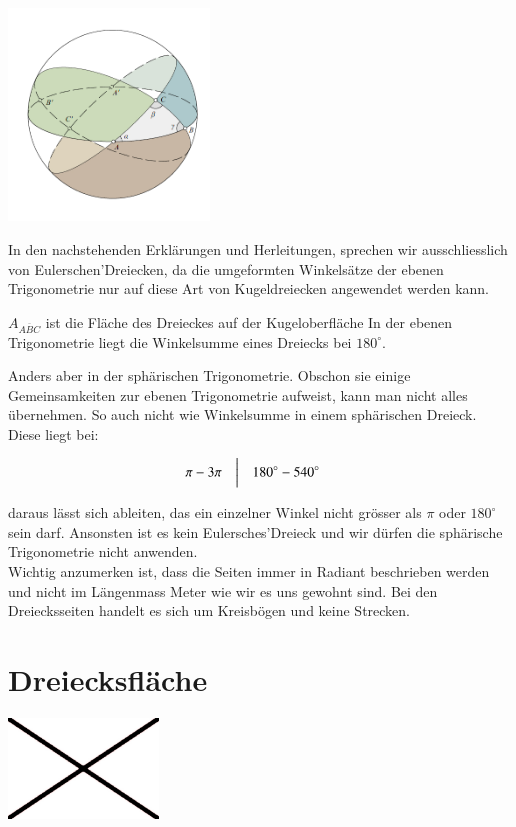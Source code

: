 \begin{refsection}
\begin{center}
        \includegraphics[width=0.4\textwidth]{kugel/Zweiecke.jpg}
\end{center}

In den nachstehenden Erklärungen und Herleitungen, sprechen wir ausschliesslich von Eulerschen’Dreiecken, da die umgeformten Winkelsätze der ebenen Trigonometrie nur auf diese Art von Kugeldreiecken angewendet werden kann.

$A_{ \overline{ ABC }}$ ist die Fläche des Dreieckes auf der Kugeloberfläche
In der ebenen Trigonometrie liegt die Winkelsumme eines Dreiecks bei
$180^{\circ}$.

Anders aber in der sphärischen Trigonometrie. Obschon sie einige Gemeinsamkeiten zur ebenen Trigonometrie aufweist, kann man nicht alles übernehmen.
So auch nicht wie Winkelsumme in einem sphärischen Dreieck.
Diese liegt bei:

\[
\begin{aligned}
\pi
&-
3\pi
&
&\text{\bigg \vert}
&
180^{\circ}
&-
540^{\circ}
\end{aligned}
\]

daraus lässt sich ableiten, das ein einzelner Winkel nicht grösser als $\pi$ oder $180^{\circ}$ sein darf. Ansonsten ist es kein Eulersches’Dreieck und wir dürfen die sphärische Trigonometrie nicht anwenden.\\
Wichtig anzumerken ist, dass die Seiten immer in Radiant beschrieben werden und nicht im Längenmass Meter wie wir es uns gewohnt sind. 
Bei den Dreiecksseiten handelt es sich um Kreisbögen und keine Strecken.

\section{Dreiecksfläche}

\begin{center}
        \includegraphics[width=0.3\textwidth]{kugel/Beispielbild.jpg}
\end{center}


\end{refsection}
